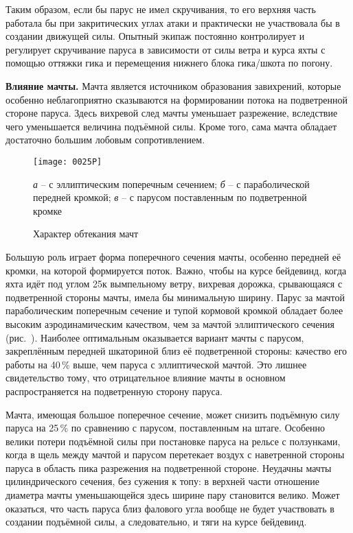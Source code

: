 Таким образом, если бы парус не имел скручивания, то его верхняя часть
работала бы при закритических углах атаки и практически не участвовала
бы в создании движущей силы. Опытный экипаж постоянно контролирует и
регулирует скручивание паруса в зависимости от силы ветра и курса яхты
с помощью оттяжки гика и перемещения нижнего блока гика\-/шкота по
погону.

\textbf{Влияние мачты.} Мачта является источником образования
завихрений, которые особенно неблагоприятно сказываются на
формировании потока на подветренной стороне паруса. Здесь вихревой
след мачты уменьшает разрежение, вследствие чего уменьшается величина
подъёмной силы. Кроме того, сама мачта обладает достаточно большим
лобовым сопротивлением.

\begin{figure}[htb]
  \centering
  \texttt{[image: 0025P]}
  \caption{Характер обтекания мачт}
  \label{fig:25}
  \small
  \centering{}
  \textit{а} \--- с эллиптическим поперечным сечением; \textit{б} \--- с параболической передней кромкой; \textit{в} \--- с парусом поставленным по подветренной кромке
\end{figure}

Большую роль играет форма поперечного сечения мачты, особенно передней
её кромки, на которой формируется поток. Важно, чтобы на курсе
бейдевинд, когда яхта идёт под углом 25\gr к вымпельному
ветру, вихревая дорожка, срывающаяся с подветренной стороны мачты,
имела бы минимальную ширину. Парус за мачтой параболическим поперечным
сечение и тупой кормовой кромкой обладает более высоким
аэродинамическим качеством, чем за мачтой эллиптического сечения
(рис.~). Наиболее оптимальным оказывается вариант мачты с
парусом, закреплённым передней шкаториной близ её подветренной
стороны: качество его работы на 40\,\% выше, чем паруса с
эллиптической мачтой. Это лишнее свидетельство тому, что отрицательное
влияние мачты в основном распространяется на подветренную сторону
паруса.

Мачта, имеющая большое поперечное сечение, может снизить подъёмную
силу паруса на 25\,\% по сравнению с парусом, поставленным на
штаге. Особенно велики потери подъёмной силы при постановке паруса на
рельсе с ползунками, когда в щель между мачтой и парусом перетекает
воздух с наветренной стороны паруса в область пика разрежения на
подветренной стороне. Неудачны мачты цилиндрического сечения, без
сужения к топу: в верхней части отношение диаметра мачты уменьшающейся
здесь ширине пару становится велико. Может оказаться, что часть паруса
близ фалового угла вообще не будет участвовать в создании подъёмной
силы, а следовательно, и тяги на курсе бейдевинд.

